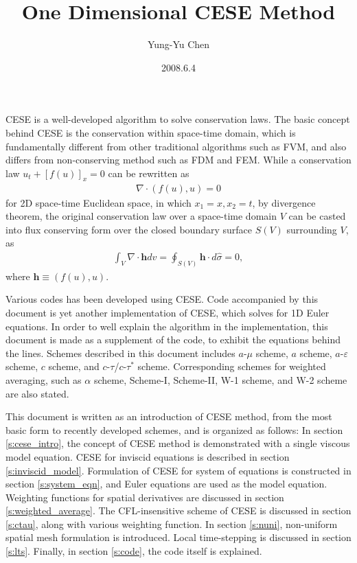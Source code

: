 \documentclass[letterpaper,12pt,dvips]{article}
\renewcommand{\vec}[1]{\mathbf{#1}}
\numberwithin{equation}{section}
\begin{document}
\title{One Dimensional CESE Method}
\author{Yung-Yu Chen}
\date{2008.6.4}

\maketitle

\tableofcontents

\hspace{.5cm}

CESE is a well-developed algorithm to solve conservation laws.
The basic concept behind CESE is the conservation within space-time domain, 
which is fundamentally different from other traditional 
algorithms such as FVM, and also differs from non-conserving method such 
as FDM and FEM\cite{b:chang95}.
While a conservation law $u_t+[f(u)]_x=0$ can be rewritten as 
\begin{align*}
  \nabla\cdot(f(u),u) = 0
\end{align*}
for 2D space-time Euclidean space, in which $x_1=x,x_2=t$, by divergence 
theorem, the original conservation law over a space-time domain $V$ can 
be casted into flux conserving form over the closed boundary surface $S(V)$ 
surrounding $V$, as 
\begin{align*}
  \int_V\nabla\cdot\vec{h}dv = \oint_{S(V)}\vec{h}\cdot d\hat{\sigma} = 0, 
\end{align*}
where $\vec{h}\equiv(f(u),u)$.

Various codes has been developed using CESE\cite{b:chang95}.
Code accompanied by this document is yet another implementation of CESE, 
which solves for 1D Euler equations.
In order to well explain the algorithm in the implementation, this 
document is made as a supplement of the code, to exhibit the equations 
behind the lines.
Schemes described in this document includes $a$-$\mu$ scheme, $a$ scheme, 
$a$-$\varepsilon$ scheme\cite{b:chang95}, $c$ scheme, and 
$c$-$\tau$/$c$-$\tau^*$ scheme\cite{b:chang03}.
Corresponding schemes for weighted averaging, such as $\alpha$ 
scheme\cite{b:chang95}, Scheme-I, Scheme-II\cite{b:chang02}, W-1 scheme, 
and W-2 scheme\cite{b:chang03} are also stated.

This document is written as an introduction of CESE method, from the most 
basic form to recently developed schemes, and is organized as follows:
In section \ref{s:cese_intro}, the concept of CESE method is 
demonstrated with a single viscous model equation.
CESE for inviscid equations is described in section 
\ref{s:inviscid_model}.
Formulation of CESE for system of equations is constructed in section
\ref{s:system_eqn}, and Euler equations are used as the model equation.
Weighting functions for spatial derivatives are discussed in section 
\ref{s:weighted_average}.
The CFL-insensitive scheme of CESE is discussed in section \ref{s:ctau}, 
along with various weighting function.
In section \ref{s:nuni}, non-uniform spatial mesh formulation is 
introduced.
Local time-stepping is discussed in section \ref{s:lts}.
Finally, in section \ref{s:code}, the code itself is explained.
\end{document}
